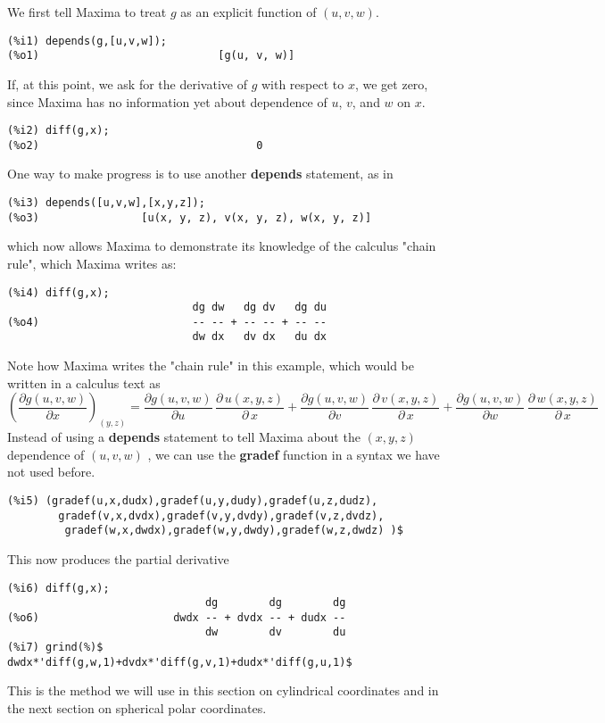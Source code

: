 \documentclass[12pt]{article}
\begin{document}
\smallskip
We first tell Maxima to treat $g$ as an explicit function of $(u,v,w)$.  
\small
\begin{verbatim}
(%i1) depends(g,[u,v,w]);
(%o1)                            [g(u, v, w)]
\end{verbatim}
\normalsize
If, at this point, we ask for the derivative of $g$ with respect to $x$,
  we get zero, since Maxima has no information yet about dependence of
  $u$, $v$, and $w$ on $x$.
\small
\begin{verbatim}
(%i2) diff(g,x);
(%o2)                                  0
\end{verbatim}
\normalsize
One way to make progress is to use another \textbf{depends} statement, as in
\small
\begin{verbatim}
(%i3) depends([u,v,w],[x,y,z]);
(%o3)                [u(x, y, z), v(x, y, z), w(x, y, z)]
\end{verbatim}
\normalsize
which now allows Maxima to demonstrate its knowledge of the calculus "chain rule",
  which Maxima writes as:
\small
\begin{verbatim}
(%i4) diff(g,x);
                             dg dw   dg dv   dg du
(%o4)                        -- -- + -- -- + -- --
                             dw dx   dv dx   du dx
\end{verbatim}
\normalsize
Note how Maxima writes the "chain rule" in this example, which would
  be written in a calculus text as
\begin{equation}
\left(\frac{\partial g(u,v,w)}{\partial x}  \right)_{(y,z)} = 
    \frac{\partial g(u,v,w)}{\partial u} \, \frac{\partial\,u(x,y,z)}{\partial\,x}  +
    \frac{\partial g(u,v,w)}{\partial v}  \, \frac{\partial\,v(x,y,z)}{\partial\,x} +
	\frac{\partial g(u,v,w)}{\partial w}  \, \frac{\partial\,w(x,y,z)}{\partial\,x}
\end{equation}
Instead of using a \textbf{depends} statement to tell Maxima about the $(x,y,z)$ 
  dependence of $(u,v,w)$ , we can use the \textbf{gradef} function in a syntax
  we have not used before.

\small
\begin{verbatim}
(%i5) (gradef(u,x,dudx),gradef(u,y,dudy),gradef(u,z,dudz),
        gradef(v,x,dvdx),gradef(v,y,dvdy),gradef(v,z,dvdz),
         gradef(w,x,dwdx),gradef(w,y,dwdy),gradef(w,z,dwdz) )$
\end{verbatim}
\normalsize
This now produces the partial derivative
\small
\begin{verbatim}
(%i6) diff(g,x);
                               dg        dg        dg
(%o6)                     dwdx -- + dvdx -- + dudx --
                               dw        dv        du
(%i7) grind(%)$
dwdx*'diff(g,w,1)+dvdx*'diff(g,v,1)+dudx*'diff(g,u,1)$							   
\end{verbatim}
\normalsize
This is the method we will use in this section on cylindrical coordinates and in
  the next section on spherical polar coordinates.
\end{document}
